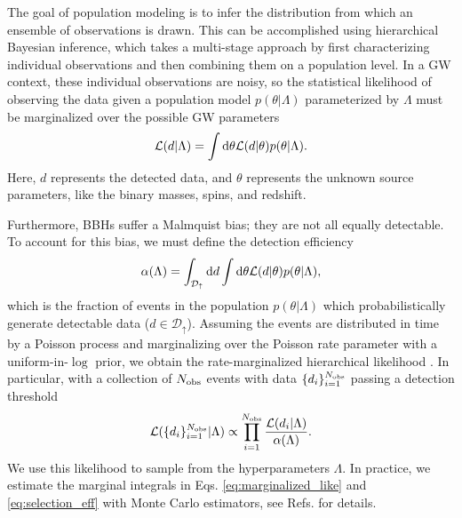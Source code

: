 \documentclass[%
 reprint,
 amsmath,amssymb,
 aps,
 prd,
]{revtex4-2}
\newcommand{\dataset}{\{d_i\}_{i=1}^{N_{\rm obs}}}
\newcommand{\beq}{\begin{equation}}
\newcommand{\eeq}{\end{equation}}
\newcommand{\parint}[1]{\int {\rm d}#1}
\newcommand{\thetaint}{\parint{\theta}}
\newcommand{\dataint}{\int_{\mathcal{D}_{\uparrow}} {\rm d}d}
\begin{document}


The goal of population modeling is to infer the distribution from which an ensemble of observations is drawn. This can be accomplished using hierarchical Bayesian inference, which takes a multi-stage approach by first characterizing individual observations and then combining them on a population level.
In a \ac{GW} context, these individual observations are noisy, so the statistical likelihood of observing the data given a population model $p(\theta | \Lambda)$ parameterized by $\Lambda$ must be marginalized over the possible \ac{GW} parameters \cite{Loredo_2004}
\beq
\mathcal{L}(d | \Lambda) = \thetaint \mathcal{L}(d|\theta) p(\theta | \Lambda).
\label{eq:marginalized_like}
\eeq
Here, $d$ represents the detected data, and $\theta$ represents the unknown source parameters, like the binary masses, spins, and redshift. 

Furthermore, BBHs suffer a Malmquist bias; they are not all equally detectable. To account for this bias, we must define the detection efficiency
\beq
\alpha(\Lambda) = \dataint \thetaint \mathcal{L}(d|\theta) p(\theta | \Lambda),
\label{eq:selection_eff}
\eeq
which is the fraction of events in the population $p(\theta | \Lambda)$ which probabilistically generate detectable data ($d \in \mathcal{D}_{\uparrow}$). Assuming the events are distributed in time by a Poisson process and marginalizing over the Poisson rate parameter with a uniform-in-$\log$ prior, we obtain the rate-marginalized hierarchical likelihood \citep{Loredo_2004, Farr:2013yna, Foreman-Mackey_2014, Mandel_2019, Vitale:2020aaz, Essick:2023upv}.
In particular, with a collection of $N_{\rm obs}$ events with data $\dataset$ passing a detection threshold 
\beq
\mathcal{L}(\dataset | \Lambda) \propto \prod_{i=1}^{N_{\rm obs}} \frac{\mathcal{L}(d_i|\Lambda)}{\alpha(\Lambda)}.
\label{eq:hierarchical_like}
\eeq
We use this likelihood to sample from the hyperparameters $\Lambda$. In practice, we estimate the marginal integrals in Eqs. \ref{eq:marginalized_like} and \ref{eq:selection_eff} with Monte Carlo estimators, see Refs. \cite{Farr_2019, Essick:2022ojx, Talbot:2023pex} for details.
\end{document}
